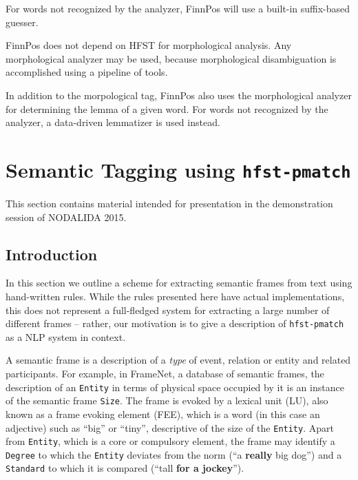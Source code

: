 \documentclass{llncs}
\begin{document}
For words not recognized by the analyzer, FinnPos will use a built-in
suffix-based guesser.

FinnPos does not depend on HFST for morphological analysis. Any
morphological analyzer may be used, because morphological
disambiguation is accomplished using a pipeline of tools.

In addition to the morpological tag, FinnPos also uses the
morphological analyzer for determining the lemma of a given word. For
words not recognized by the analyzer, a data-driven lemmatizer is used
instead.

\section{Semantic Tagging using {\tt hfst-pmatch}}\label{sec:sem-tagging}

This section contains material intended for presentation in the
demonstration session of NODALIDA 2015.

\subsection{Introduction}

In this section we outline a scheme for extracting semantic frames from text
using hand-written rules. While the rules presented here have actual
implementations, this does not represent a full-fledged system
for extracting a large number of different frames -- rather, our motivation is
to give a description of \verb+hfst-pmatch+ as a NLP system in context.

A semantic frame \cite{semantic-frame} is a description of a \emph{type} of event, relation or entity
and related participants. For example, in FrameNet,
a database of semantic frames,
the description of an \verb+Entity+ in terms of physical space occupied by it is
an instance of the semantic frame \verb+Size+. The frame is evoked by
a lexical unit (LU), also known as a frame evoking element (FEE), which is a
word (in this case an adjective)
such as ``big'' or ``tiny'', descriptive of the size of the \verb+Entity+.
Apart from \verb+Entity+, which is a core or compulsory element, the
frame may identify a \verb+Degree+ to which the \verb+Entity+ deviates
from the norm (``a \textbf{really} big dog'') and a \verb+Standard+ to
which it is compared (``tall \textbf{for a jockey}'').
\end{document}
